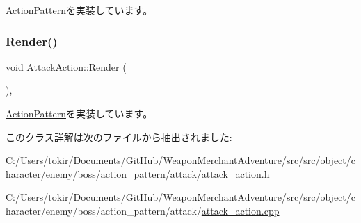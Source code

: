 \mbox{\hyperlink{class_action_pattern_ac8f2228ca469ce6fe29a9775bf393e0e}{Action\+Pattern}}を実装しています。

\mbox{\label{class_attack_action_a779cc8743807e3e5d01cb3dd14f92bd7}} 
\subsubsection{\texorpdfstring{Render()}{Render()}}
{\footnotesize\ttfamily void Attack\+Action\+::\+Render (\begin{DoxyParamCaption}{ }\end{DoxyParamCaption})\hspace{0.3cm}{\ttfamily [final]}, {\ttfamily [virtual]}}



\mbox{\hyperlink{class_action_pattern_a313199aa5d15b6f9381b916ffe23fe6a}{Action\+Pattern}}を実装しています。



このクラス詳解は次のファイルから抽出されました\+:\begin{DoxyCompactItemize}
\item 
C\+:/\+Users/tokir/\+Documents/\+Git\+Hub/\+Weapon\+Merchant\+Adventure/src/src/object/character/enemy/boss/action\+\_\+pattern/attack/\mbox{\hyperlink{attack__action_8h}{attack\+\_\+action.\+h}}\item 
C\+:/\+Users/tokir/\+Documents/\+Git\+Hub/\+Weapon\+Merchant\+Adventure/src/src/object/character/enemy/boss/action\+\_\+pattern/attack/\mbox{\hyperlink{attack__action_8cpp}{attack\+\_\+action.\+cpp}}\end{DoxyCompactItemize}
